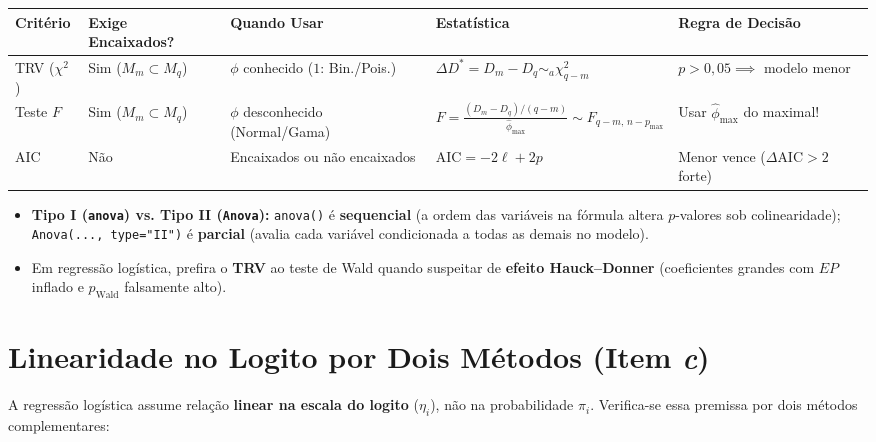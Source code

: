 \documentclass[11pt,a4paper]{article}
\begin{document}
\begin{center}
\small
\begin{tabular}{@{}lllll@{}}
\toprule
\textbf{Critério} & \textbf{Exige Encaixados?} & \textbf{Quando Usar} & \textbf{Estatística} & \textbf{Regra de Decisão} \\
\midrule
TRV ($\chi^2$) & Sim ($M_m \subset M_q$) & $\phi$ conhecido ($1$: Bin./Pois.) & $\Delta D^* = D_m - D_q \sim_a \chi^2_{q-m}$ & $p > 0{,}05 \implies$ modelo menor \\
Teste $F$ & Sim ($M_m \subset M_q$) & $\phi$ desconhecido (Normal/Gama) & $F = \frac{(D_m - D_q)/(q-m)}{\hat{\phi}_{\max}} \sim F_{q-m,\,n-p_{\max}}$ & Usar $\hat{\phi}_{\max}$ do maximal! \\
$\text{AIC}$ & Não & Encaixados ou não encaixados & $\text{AIC} = -2\ell + 2p$ & Menor vence ($\Delta\text{AIC}>2$ forte) \\
\bottomrule
\end{tabular}
\end{center}

\begin{itemize}[leftmargin=1.4em]
  \item \textbf{Tipo I (\texttt{anova}) vs. Tipo II (\texttt{Anova}):} \texttt{anova()} é \textbf{sequencial} (a ordem das variáveis na fórmula altera $p$-valores sob colinearidade); \texttt{Anova(..., type="II")} é \textbf{parcial} (avalia cada variável condicionada a todas as demais no modelo).
  \item Em regressão logística, prefira o \textbf{TRV} ao teste de Wald quando suspeitar de \textbf{efeito Hauck--Donner} (coeficientes grandes com $EP$ inflado e $p_{\text{Wald}}$ falsamente alto).
\end{itemize}

\section{Linearidade no Logito por Dois Métodos (Item \textit{c})}

A regressão logística assume relação \textbf{linear na escala do logito} ($\eta_i$), não na probabilidade $\pi_i$. Verifica-se essa premissa por dois métodos complementares:
\end{document}
